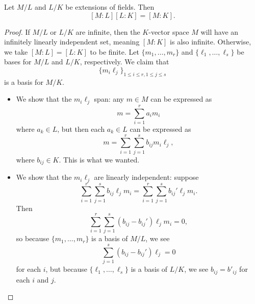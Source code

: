\documentclass[../notes.tex]{subfiles}
\begin{document}
\begin{lemma} \label{lem:deg-in-towers}
	Let $M/L$ and $L/K$ be extensions of fields. Then
	\[[M:L][L:K]=[M:K].\]
\end{lemma}
\begin{proof}
	If $M/L$ or $L/K$ are infinite, then the $K$-vector space $M$ will have an infinitely linearly independent set, meaning $[M:K]$ is also infinite. Otherwise, we take $[M:L]=[L:K]$ to be finite. Let $\{m_1,\ldots,m_r\}$ and $\{\ell_1,\ldots,\ell_s\}$ be bases for $M/L$ and $L/K$, respectively. We claim that
	\[\{m_i\ell_j\}_{1\le i\le r,1\le j\le s}\]
	is a basis for $M/K$.
	\begin{itemize}
		\item We show that the $m_i\ell_j$ span: any $m\in M$ can be expressed as
		\[m=\sum_{i=1}^ra_im_i\]
		where $a_k\in L$, but then each $a_k\in L$ can be expressed as
		\[m=\sum_{i=1}^r\sum_{j=1}^sb_{ij}m_i\ell_j,\]
		where $b_{ij}\in K$. This is what we wanted.
		\item We show that the $m_i\ell_j$ are linearly independent: suppose
		\[\sum_{i=1}^r\sum_{j=1}^sb_{ij}\ell_jm_i=\sum_{i=1}^r\sum_{j=1}^sb_{ij}'\ell_jm_i.\]
		Then
		\[\sum_{i=1}^r\sum_{j=1}^s(b_{ij}-b_{ij}')\ell_jm_i=0,\]
		so because $\{m_1,\ldots,m_r\}$ is a basis of $M/L$, we see
		\[\sum_{j=1}^s(b_{ij}-b_{ij}')\ell_j=0\]
		for each $i$, but because $\{\ell_1,\ldots,\ell_s\}$ is a basis of $L/K$, we see $b_{ij}=b'_{ij}$ for each $i$ and $j$.
		\qedhere
	\end{itemize}
\end{proof}
\end{document}
